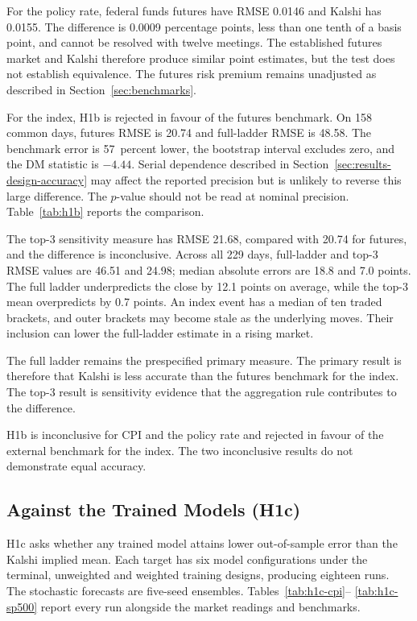 \documentclass[12pt,a4paper]{report}
\begin{document}
For the policy rate, federal funds futures have RMSE 0.0146 and Kalshi has
0.0155. The difference is 0.0009 percentage points, less than one tenth of a
basis point, and cannot be resolved with twelve meetings. The established
futures market \parencite{gurkaynak2007} and Kalshi therefore produce similar
point estimates, but the test does not establish equivalence. The futures risk
premium remains unadjusted as described in Section~\ref{sec:benchmarks}.

For the index, H1b is rejected in favour of the futures benchmark. On 158
common days, futures RMSE is 20.74 and full-ladder RMSE is 48.58. The benchmark
error is 57~percent lower, the bootstrap interval excludes zero, and the DM
statistic is $-4.44$. Serial dependence described in
Section~\ref{sec:results-design-accuracy} may affect the reported precision but
is unlikely to reverse this large difference. The $p$-value should not be read
at nominal precision. Table~\ref{tab:h1b} reports the comparison.

The top-3 sensitivity measure has RMSE 21.68, compared with 20.74 for futures,
and the difference is inconclusive. Across all 229 days, full-ladder and top-3
RMSE values are 46.51 and 24.98; median absolute errors are 18.8 and 7.0 points.
The full ladder underpredicts the close by 12.1 points on average, while the
top-3 mean overpredicts by 0.7 points. An index event has a median of ten traded
brackets, and outer brackets may become stale as the underlying moves. Their
inclusion can lower the full-ladder estimate in a rising market.

The full ladder remains the prespecified primary measure. The primary result
is therefore that Kalshi is less accurate than the futures benchmark for the
index. The top-3 result is sensitivity evidence that the aggregation rule
contributes to the difference.

H1b is inconclusive for CPI and the policy rate and rejected in favour of the
external benchmark for the index. The two inconclusive results do not
demonstrate equal accuracy.

\subsection{Against the Trained Models (H1c)}
\label{sec:results-h1c}

H1c asks whether any trained model attains lower out-of-sample error than the
Kalshi implied mean. Each target has six model configurations under the
terminal, unweighted and weighted training designs, producing eighteen runs.
The stochastic forecasts are five-seed ensembles. Tables~\ref{tab:h1c-cpi}--
\ref{tab:h1c-sp500} report every run alongside the market readings and
benchmarks.
\end{document}
